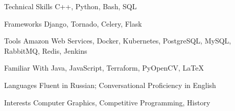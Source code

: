 

\begin{cvskills}
  \cvskill
    {Technical Skills} %
    {C++, Python, Bash, SQL} %

  \cvskill
    {Frameworks} %
    {Django, Tornado, Celery, Flask} %

  \cvskill
    {Tools} %
    {Amazon Web Services, Docker, Kubernetes, PostgreSQL, MySQL, RabbitMQ, Redis, Jenkins} %

  \cvskill
    {Familiar With} %
    {Java, JavaScript, Terraform, PyOpenCV, \LaTeX} %

  \cvskill
    {Languages} %
    {Fluent in Russian; Conversational Proficiency in English} %

  \cvskill
    {Interests} %
    {Computer Graphics, Competitive Programming, History} %


\end{cvskills}
